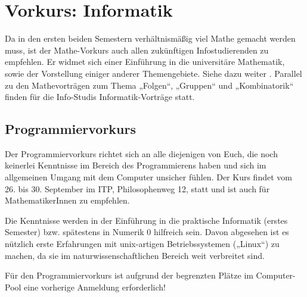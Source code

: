 \section{Vorkurs: Informatik}
\label{vkinfo}
Da in den ersten beiden Semestern verhältnismäßig viel Mathe gemacht werden muss, ist der Mathe-Vorkurs auch allen zukünftigen Infostudierenden zu empfehlen. Er widmet sich einer Einführung in die universitäre Mathematik, sowie der Vorstellung einiger anderer Themengebiete. Siehe dazu weiter
.
Parallel zu den Mathevorträgen zum Thema „Folgen“, „Gruppen“ und „Kombinatorik“ finden für die Info-Studis Informatik-Vorträge statt.

\parskip

\subsection{Programmiervorkurs}
Der Programmiervorkurs richtet sich an alle diejenigen von Euch, die noch keinerlei Kenntnisse im Bereich des Programmierens haben und sich im allgemeinen Umgang mit dem Computer unsicher fühlen. Der Kurs findet vom 26. bis 30. September im \gls{ITP}, Philosophenweg 12, statt und ist auch für MathematikerInnen zu empfehlen.

Die Kenntnisse werden in der Einführung in die praktische Informatik (erstes Semester) bzw. spätestens in Numerik 0 hilfreich sein. Davon abgesehen ist es nützlich erste Erfahrungen mit unix-artigen Betriebssystemen („Linux“) zu machen, da sie im naturwissenschaftlichen Bereich weit verbreitet sind.

Für den Programmiervorkurs ist aufgrund der begrenzten Plätze im Computer-Pool eine vorherige Anmeldung erforderlich!
